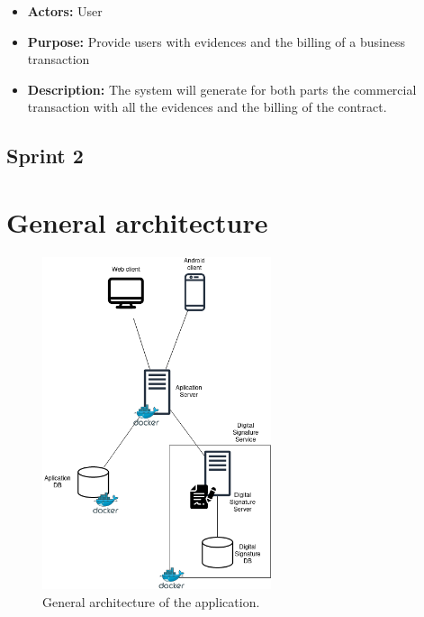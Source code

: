 \documentclass[./main.tex]{subfiles}
\begin{document}
\begin{itemize}
  \begin{itemize}
  
  \item
    \textbf{Actors:} User
  \item
    \textbf{Purpose:} Provide users with evidences and the billing of a
    business transaction
  \item
    \textbf{Description:} The system will generate for both parts the
    commercial transaction with all the evidences and the billing of
    the contract.
  \end{itemize}
\end{itemize}

\subsection{Sprint 2}

\hypertarget{general-architecture}{%
\section{General architecture}\label{general-architecture}}

\begin{figure}[H]
\centering
\includegraphics[width=0.6\textwidth]{architecture_diagram/Architecture.drawio.png}
\caption{General architecture of the application.}
\end{figure}

\end{document}
